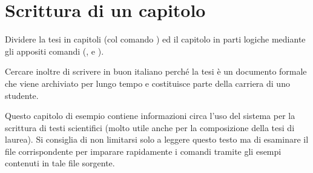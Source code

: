 \section{Scrittura di un capitolo}

Dividere la tesi in capitoli (col comando ) ed il capitolo in parti logiche mediante gli appositi comandi (,  e ).

Cercare inoltre di scrivere in  buon italiano perché la tesi è un documento formale che viene archiviato per lungo tempo e costituisce parte della carriera di uno studente.

Questo capitolo di esempio contiene informazioni circa l'uso del sistema \ltx per la scrittura di testi scientifici (molto utile anche per la composizione della tesi di laurea).
Si consiglia di non limitarsi solo a leggere questo testo ma di esaminare il file   corrispondente per imparare rapidamente i comandi \ltx tramite gli esempi contenuti in tale file sorgente.